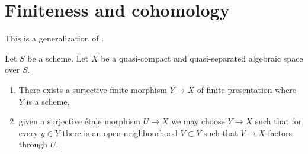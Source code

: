 
\section{Finiteness and cohomology}
This is a generalization of \cite[Lem.\ 2.8]{Ko90}.
\begin{proposition}
\label{proposition-there-is-a-scheme-finite-over}
Let $S$ be a scheme. Let $X$ be a quasi-compact and quasi-separated
algebraic space over $S$.
\begin{enumerate}
\item There exists a surjective finite morphism $Y \to X$
of finite presentation where $Y$ is a scheme,
\item given a surjective \'etale morphism $U \to X$ we may choose
$Y \to X$ such that for every $y \in Y$ there is an open neighbourhood
$V \subset Y$ such that $V \to X$ factors through $U$.
\end{enumerate}
\end{proposition}

